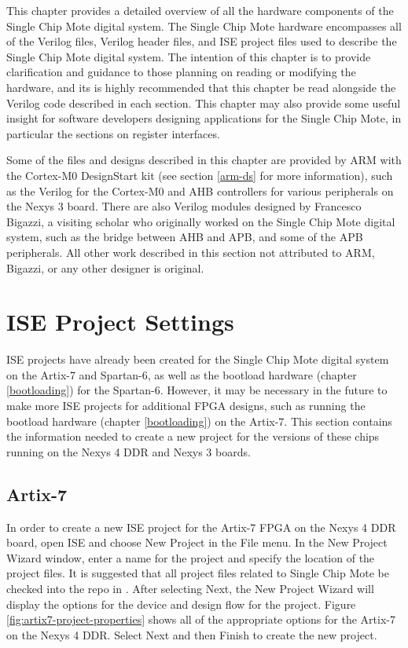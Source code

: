 This chapter provides a detailed overview of all the hardware components of the Single Chip Mote digital system. The Single Chip Mote hardware encompasses all of the Verilog files, Verilog header files, and ISE project files used to describe the Single Chip Mote digital system. The intention of this chapter is to provide clarification and guidance to those planning on reading or modifying the hardware, and its is highly recommended that this chapter be read alongside the Verilog code described in each section. This chapter may also provide some useful insight for software developers designing applications for the Single Chip Mote, in particular the sections on register interfaces.

Some of the files and designs described in this chapter are provided by ARM with the Cortex-M0 DesignStart kit (see section \ref{arm-ds} for more information), such as the Verilog for the Cortex-M0 and AHB controllers for various peripherals on the Nexys 3 board. There are also Verilog modules designed by Francesco Bigazzi, a visiting scholar who originally worked on the Single Chip Mote digital system, such as the bridge between AHB and APB, and some of the APB peripherals. All other work described in this section not attributed to ARM, Bigazzi, or any other designer is original. 

\section{ISE Project Settings} \label{ise-project-settings}
ISE projects have already been created for the Single Chip Mote digital system on the Artix-7 and Spartan-6, as well as the bootload hardware (chapter \ref{bootloading}) for the Spartan-6. However, it may be necessary in the future to make more ISE projects for additional FPGA designs, such as running the bootload hardware (chapter \ref{bootloading}) on the Artix-7. This section contains the information needed to create a new project for the versions of these chips running on the Nexys 4 DDR and Nexys 3 boards.

\subsection{Artix-7}
In order to create a new ISE project for the Artix-7 FPGA on the Nexys 4 DDR board, open ISE and choose New Project in the File menu. In the New Project Wizard window, enter a name for the project and specify the location of the project files. It is suggested that all project files related to Single Chip Mote be checked into the repo in . After selecting Next, the New Project Wizard will display the options for the device and design flow for the project. Figure \ref{fig:artix7-project-properties} shows all of the appropriate options for the Artix-7 on the Nexys 4 DDR. Select Next and then Finish to create the new project.

